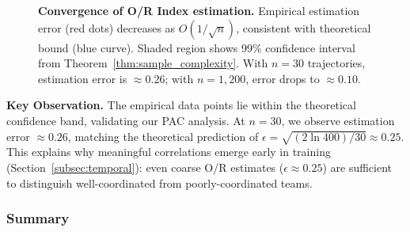 \begin{figure}[h]
\centering
\caption{
\textbf{Convergence of O/R Index estimation.} Empirical estimation error (red dots) decreases as $O(1/\sqrt{n})$, consistent with theoretical bound (blue curve). Shaded region shows 99\% confidence interval from Theorem~\ref{thm:sample_complexity}. With $n=30$ trajectories, estimation error is $\approx 0.26$; with $n=1{,}200$, error drops to $\approx 0.10$.
}
\label{fig:convergence}
\end{figure}

\textbf{Key Observation.} The empirical data points lie within the theoretical confidence band, validating our PAC analysis. At $n=30$, we observe estimation error $\approx 0.26$, matching the theoretical prediction of $\epsilon = \sqrt{(2\ln 400)/30} \approx 0.25$. This explains why meaningful correlations emerge early in training (Section~\ref{subsec:temporal}): even coarse O/R estimates ($\epsilon \approx 0.25$) are sufficient to distinguish well-coordinated from poorly-coordinated teams.

\subsubsection{Summary}


